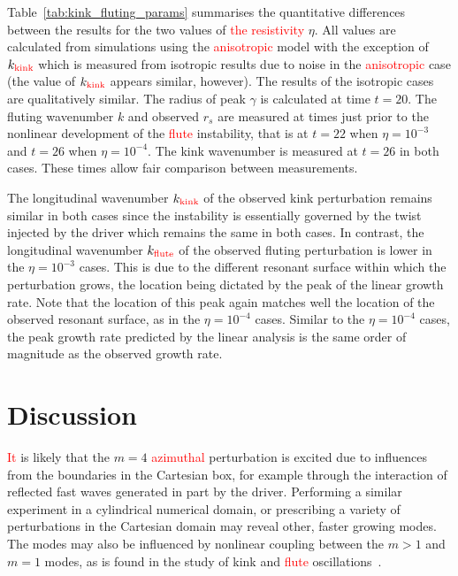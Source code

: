 \documentclass[12pt]{article}
\newcommand{\rs}[2]{\textcolor{red}{#2}}
\begin{document}
Table~\ref{tab:kink_fluting_params} summarises the quantitative
differences between the results for the two values of \rs{}{the
  resistivity} $\eta$. All values are calculated from simulations using the \rs{switching}{anisotropic} model with the exception of $k_{\rs{kink}{\text{kink}}}$ which is measured from isotropic results due to noise in the \rs{switching}{anisotropic} case (the value of $k_{\rs{kink}{\text{kink}}}$ appears similar, however). The results of the isotropic cases are qualitatively similar. The radius of peak $\gamma$ is calculated at time $t=20$. The fluting wavenumber $k$ and observed $r_s$ are measured at times just prior to the nonlinear development of the \rs{fluting}{flute} instability, that is at $t=22$ when $\eta=10^{-3}$ and $t=26$ when $\eta = 10^{-4}$. The kink wavenumber is measured at $t=26$ in both cases. These times allow fair comparison between measurements.

The longitudinal wavenumber $k_{\rs{kink}{\text{kink}}}$ of the observed kink perturbation remains similar in both cases since the instability is essentially governed by the twist injected by the driver which remains the same in both cases. In contrast, the longitudinal wavenumber $k_{\rs{flute}{\text{flute}}}$ of the observed fluting perturbation is lower in the $\eta=10^{-3}$ cases. This is due to the different resonant surface within which the perturbation grows, the location being dictated by the peak of the linear growth rate. Note that the location of this peak again matches well the location of the observed resonant surface, as in the $\eta=10^{-4}$ cases. Similar to the $\eta=10^{-4}$ cases, the peak growth rate predicted by the linear analysis is the same order of magnitude as the observed growth rate.

\section{Discussion}
\label{sec-discussion}

\rs{Due to the perturbations arising from numerical noise, it}{It} is
likely that the $m=4$ \rs{}{azimuthal} perturbation is excited due to
influences from the boundaries in the Cartesian box, for example
through the interaction of reflected fast waves generated in part by
the driver. Performing a similar experiment in a cylindrical numerical
domain, or prescribing a variety of perturbations in the Cartesian
domain may reveal other, faster growing modes. The modes may also be
influenced by nonlinear coupling between the $m>1$ and $m=1$ modes, as
is found in the study of kink and \rs{fluting}{flute}
oscillations~\cite{terradasEffectMagneticTwist2018,rudermanNonlinearGenerationFluting2017}. 
\end{document}
